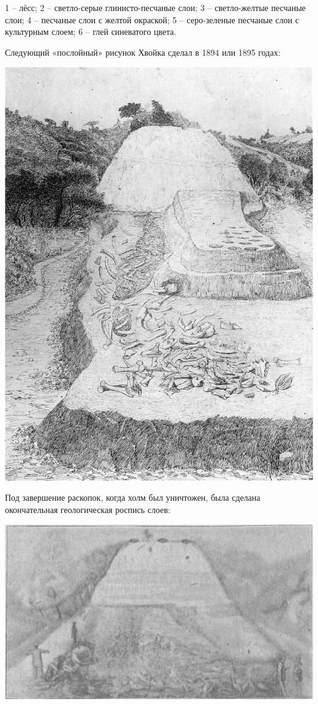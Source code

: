 1 – лёсс; 2 – светло-серые глинисто-песчаные слои; 3 – светло-желтые песчаные слои; 4 – песчаные слои с желтой окраской; 5 – серо-зеленые песчаные слои с культурным слоем; 6 – глей синеватого цвета.

Следующий «послойный» рисунок Хвойка сделал в 1894 или 1895 годах:
\vspace*{\fill}
\begin{center}
\includegraphics[width=\linewidth]{chast-kirvys/kirstoy/1894-hvoyka-01-01.jpg}
\end{center}
\vspace*{\fill}
\newpage

Под завершение раскопок, когда холм был уничтожен, была сделана окончательная геологическая роспись слоев:

\begin{center}
\includegraphics[width=\linewidth]{chast-kirvys/kirstoy/1899-hvoyka-01.jpg}
\end{center}

